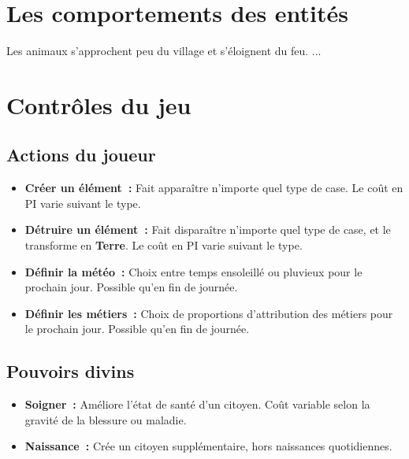 \documentclass[a4paper]{article}
\begin{document}
\section*{Les comportements des entités}
Les animaux s'approchent peu du village et s'éloignent du feu.
\newline
...


\section*{Contrôles du jeu}

\subsection*{Actions du joueur}
\begin{itemize}
\item \textbf{Créer un élément :} \small Fait apparaître n'importe quel type de case. Le coût en PI varie suivant le type. \normalsize
\item \textbf{Détruire un élément :} \small Fait disparaître n'importe quel type de case, et le transforme en \textbf{Terre}. Le coût en PI varie suivant le type. \normalsize
\item \textbf{Définir la météo :} \small Choix entre temps ensoleillé ou pluvieux pour le prochain jour. Possible qu'en fin de journée. \normalsize
\item \textbf{Définir les métiers :} \small Choix de proportions d'attribution des métiers pour le prochain jour. Possible qu'en fin de journée. \normalsize
\end{itemize}

\subsection*{Pouvoirs divins}
\begin{itemize}
\item \textbf{Soigner :} \small Améliore l'état de santé d'un citoyen. Coût variable selon la gravité de la blessure ou maladie. \normalsize
\item \textbf{Naissance :} \small Crée un citoyen supplémentaire, hors naissances quotidiennes. \normalsize
\end{itemize}
\end{document}
